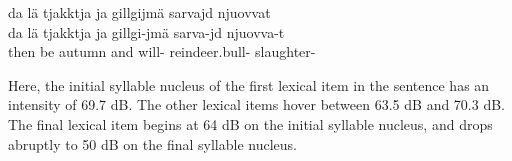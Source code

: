 \ea\label{intonationDropEx}
\glll	da lä tjakktja ja gillgijmä sarvajd njuovvat\\
	da lä tjakktja ja gillgi-jmä sarva-jd njuovva-t\\
	then be\BS{} autumn\BS{} and will- reindeer.bull- slaughter-\\\nopagebreak
{} 
\z 
\FB

Here, the initial syllable nucleus of the first lexical item in the sentence  has an intensity of 69.7 dB. The other lexical items hover between 63.5 dB and 70.3 dB. The final lexical item  begins at 64 dB on the initial syllable nucleus, and drops abruptly to 50 dB on the final syllable nucleus. 



